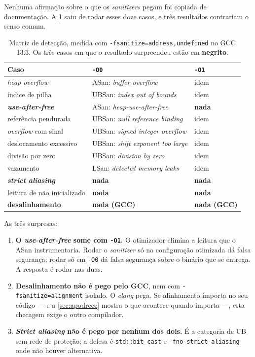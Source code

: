 Nenhuma afirmação sobre o que os \emph{sanitizers} pegam foi copiada de
documentação. A \cref{tab:matriz-ub} saiu de rodar esses doze casos, e três
resultados contrariam o senso comum.

\begin{table}[htbp]
\centering
\caption{Matriz de detecção, medida com
         \texttt{-fsanitize=address,undefined} no GCC 13.3. Os três casos em
         que o resultado surpreendeu estão em \textbf{negrito}.}
\label{tab:matriz-ub}
\footnotesize
\begin{tabular}{@{}lll@{}}
\toprule
\textbf{Caso} & \textbf{\texttt{-O0}} & \textbf{\texttt{-O1}} \\
\midrule
\emph{heap overflow}      & ASan: \emph{buffer-overflow}       & idem \\
índice de pilha           & UBSan: \emph{index out of bounds}  & idem \\
\textbf{\emph{use-after-free}} & ASan: \emph{heap-use-after-free} & \textbf{nada} \\
referência pendurada      & UBSan: \emph{null reference binding} & idem \\
\emph{overflow} com sinal & UBSan: \emph{signed integer overflow} & idem \\
deslocamento excessivo    & UBSan: \emph{shift exponent too large} & idem \\
divisão por zero          & UBSan: \emph{division by zero}     & idem \\
vazamento                 & LSan: \emph{detected memory leaks} & idem \\
\textbf{\emph{strict aliasing}} & \textbf{nada}                & \textbf{nada} \\
leitura de não inicializado & \textbf{nada}                    & \textbf{nada} \\
\textbf{desalinhamento}   & \textbf{nada (GCC)}                & \textbf{nada (GCC)} \\
\bottomrule
\end{tabular}
\end{table}

As três surpresas:

\begin{enumerate}
    \item \textbf{O \emph{use-after-free} some com \texttt{-O1}.} O otimizador
          elimina a leitura que o ASan instrumentaria. Rodar o \emph{sanitizer}
          só na configuração otimizada dá falsa segurança; rodar só em
          \texttt{-O0} dá falsa segurança sobre o binário que se entrega. A
          resposta é rodar nas duas.
    \item \textbf{Desalinhamento não é pego pelo GCC}, nem com
          \texttt{-fsanitize=alignment} isolado. O \emph{clang} pega. Se
          alinhamento importa no seu código --- e a \cref{sec:apodrece} mostra
          o que acontece quando importa ---, esta checagem exige o outro
          compilador.
    \item \textbf{\emph{Strict aliasing} não é pego por nenhum dos dois.} É a
          categoria de UB sem rede de proteção; a defesa é \texttt{std::bit\_cast}
          e \texttt{-fno-strict-aliasing} onde não houver alternativa.
\end{enumerate}

